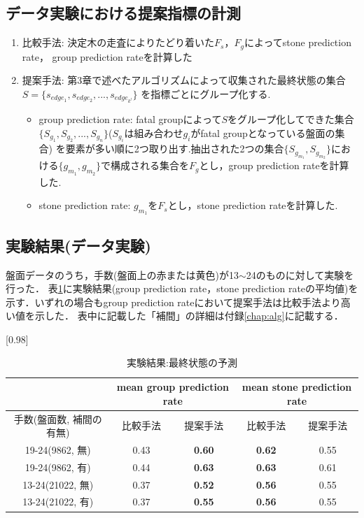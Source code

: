 \subsection{データ実験における提案指標の計測}

\begin{enumerate}
	\item 比較手法: 決定木の走査によりたどり着いた$F_s， F_g$によってstone prediction rate， group prediction rateを計算した
	\item 提案手法: 第3章で述べたアルゴリズムによって収集された最終状態の集合$S=\{s_{edge_1}, s_{edge_2}, ..., s_{edge_{k^l}}\}$
	    を指標ごとにグループ化する.
		\begin{itemize}
			\item group prediction rate: fatal groupによって$S$をグループ化してできた集合$\{S_{g_1}, S_{g_2}, ..., S_{g_n}\}$($S_{g_i}$は組み合わせ$g_i$がfatal groupとなっている盤面の集合)
			を要素が多い順に2つ取り出す.抽出された2つの集合$\{S_{g_{m_1}}, S_{g_{m_2}}\}$における$\{g_{m_1}, g_{m_2}\}$で構成される集合を$F_g$とし，group prediction rateを計算した.
			\item stone prediction rate: $g_{m_1}$を$F_s$とし，stone prediction rateを計算した.
		\end{itemize}
		
\end{enumerate}

\subsection{実験結果(データ実験)}
盤面データのうち，手数(盤面上の赤または黄色)が13$\sim$24のものに対して実験を行った．
表\ref{table:result-online}に実験結果(group prediction rate，stone prediction rateの平均値)を示す．いずれの場合もgroup prediction rateにおいて提案手法は比較手法より高い値を示した．
表中に記載した「補間」の詳細は付録\ref{chap:alg}に記載する．
\begin{table}[H]
	\caption{実験結果:最終状態の予測}
	\centering
	\scalebox{0.98}[0.98]{
		\begin{tabular}{c|c|c|c|c}
			\multicolumn{1}{c}{} & \multicolumn{2}{|c|}{mean group prediction rate} 
			& \multicolumn{2}{c|}{mean stone prediction rate}\\ \hline \hline
			手数(盤面数, 補間の有無)  & 比較手法  & 提案手法 & 比較手法 & 提案手法  \\ \hline
			19-24(9862, 無)  & 0.43  & \bf{0.60} & \bf{0.62}  & 0.55  \\
			19-24(9862, 有) & 0.44   & \bf{0.63} & \bf{0.63}  & 0.61   \\
			13-24(21022, 無) & 0.37  & \bf{0.52} & \bf{0.56} & 0.55   \\
			13-24(21022, 有)   & 0.37 & \bf{0.55} & \bf{0.56} & 0.55   \\
		\end{tabular}
	}
	\label{table:result-online}
\end{table}
